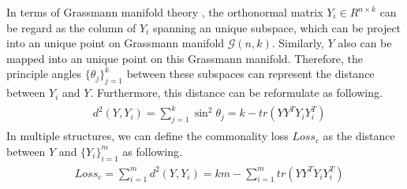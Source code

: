 \documentclass[review]{elsarticle}
\begin{document}
In terms of Grassmann manifold theory \cite{lin2012multi}\cite{turaga2011statistical}, the orthonormal matrix $Y_{i}\in R^{n\times k}$ can be regard as the column of $Y_{i}$ spanning an unique subspace, which can be project into an unique point on Grassmann manifold $\mathcal{G}(n,k)$. Similarly, $Y$ also can be mapped into an unique point on this Grassmann manifold. Therefore, the principle angles $\{\theta_{j}\}_{j=1}^{k}$ between these subspaces can represent the distance between $Y_{i}$ and $Y$. Furthermore, this distance can be reformulate as following\cite{dong2013clustering}.
\begin{align}
\label{loss4}
\begin{aligned}
&d^{2}(Y,Y_{i})=\sum_{j=1}^{k}\sin^{2}\theta_{j}=k-tr(YY^{T}Y_{i}Y_{i}^{T})
\end{aligned}
\end{align}
In multiple structures, we can define  the commonality loss $Loss_{c}$ as the distance between $Y$ and $\{Y_{i}\}_{i=1}^{m}$ as following.
\begin{align}
\label{loss5}
\begin{aligned}
&Loss_{c}=\sum_{i=1}^{m}d^{2}(Y,Y_{i})=km-\sum_{i=1}^{m}tr(YY^{T}Y_{i}Y_{i}^{T})
\end{aligned}
\end{align}
\end{document}
